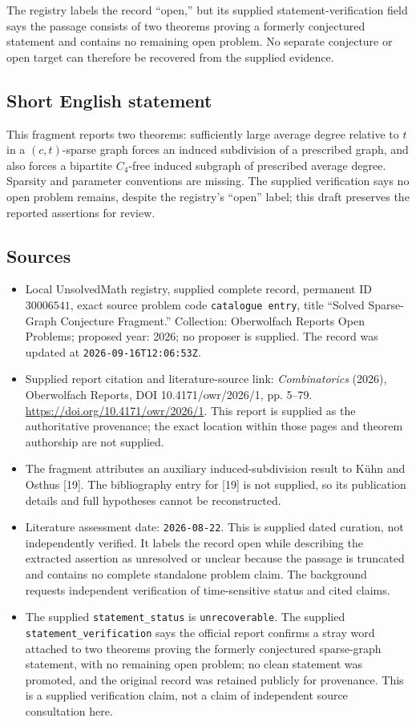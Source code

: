 \documentclass[11pt]{article}
\begin{document}
The registry labels the record ``open,'' but its supplied statement-verification field says the passage consists of two theorems proving a formerly conjectured statement and contains no remaining open problem. No separate conjecture or open target can therefore be recovered from the supplied evidence.
\subsection{Short English statement}
This fragment reports two theorems: sufficiently large average degree relative to \(t\) in a \((c,t)\)-sparse graph forces an induced subdivision of a prescribed graph, and also forces a bipartite \(C_4\)-free induced subgraph of prescribed average degree. Sparsity and parameter conventions are missing. The supplied verification says no open problem remains, despite the registry's ``open'' label; this draft preserves the reported assertions for review.
\subsection{Sources}
\begin{itemize}
\item Local UnsolvedMath registry, supplied complete record, permanent ID \(30006541\), exact source problem code \texttt{catalogue entry}, title ``Solved Sparse-Graph Conjecture Fragment.'' Collection: Oberwolfach Reports Open Problems; proposed year: 2026; no proposer is supplied. The record was updated at \texttt{2026-09-16T12:06:53Z}.
\item Supplied report citation and literature-source link: \emph{Combinatorics} (2026), Oberwolfach Reports, DOI 10.4171/owr/2026/1, pp. 5--79. \url{https://doi.org/10.4171/owr/2026/1}. This report is supplied as the authoritative provenance; the exact location within those pages and theorem authorship are not supplied.
\item The fragment attributes an auxiliary induced-subdivision result to K\"uhn and Osthus [19]. The bibliography entry for [19] is not supplied, so its publication details and full hypotheses cannot be reconstructed.
\item Literature assessment date: \texttt{2026-08-22}. This is supplied dated curation, not independently verified. It labels the record open while describing the extracted assertion as unresolved or unclear because the passage is truncated and contains no complete standalone problem claim. The background requests independent verification of time-sensitive status and cited claims.
\item The supplied \texttt{statement\_status} is \texttt{unrecoverable}. The supplied \texttt{statement\_verification} says the official report confirms a stray word attached to two theorems proving the formerly conjectured sparse-graph statement, with no remaining open problem; no clean statement was promoted, and the original record was retained publicly for provenance. This is a supplied verification claim, not a claim of independent source consultation here.
\end{itemize}
\end{document}
